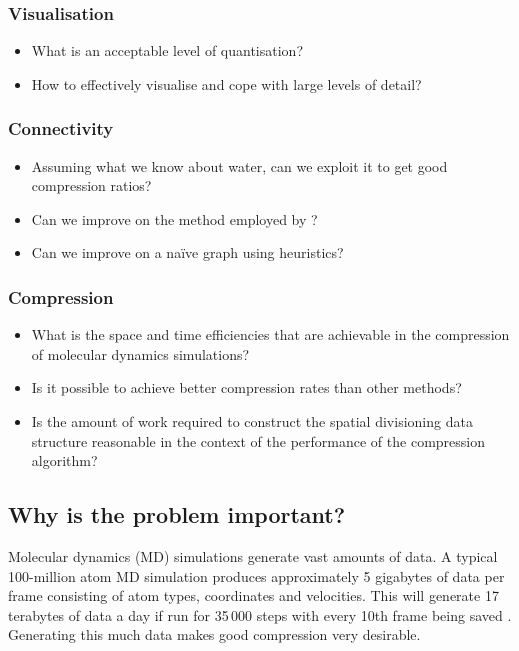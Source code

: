 \documentclass[a4paper,twocolumn]{article}
\begin{document}
\subsubsection*{Visualisation}
\begin{itemize}
\item What is an acceptable level of quantisation?
\item How to effectively visualise and cope with large levels of detail?
\end{itemize}

\subsubsection*{Connectivity}
\begin{itemize}
\item Assuming what we know about water, can we exploit it to get good
  compression ratios?
\item Can we improve on the method employed by \citep{devillers2000gci}?
\item Can we improve on a na\"ive graph using heuristics?
\end{itemize}

\subsubsection*{Compression}
\begin{itemize}
\item What is the space and time efficiencies that are achievable in the
  compression of molecular dynamics simulations?
\item Is it possible to achieve better compression rates than other methods?
\item Is the amount of work required to construct the spatial divisioning data
  structure reasonable in the context of the performance of the compression
  algorithm?
\end{itemize}

\subsection{Why is the problem important?}

Molecular dynamics (MD) simulations generate vast amounts of data. A typical
100-million atom MD simulation produces approximately 5 gigabytes of data per
frame consisting of atom types, coordinates and velocities. This will generate
17 terabytes of data a day if run for 35\,000 steps with every 10th frame
being saved \citep{omeltchenko2000sls}. Generating this much data makes good
compression very desirable.
\end{document}
